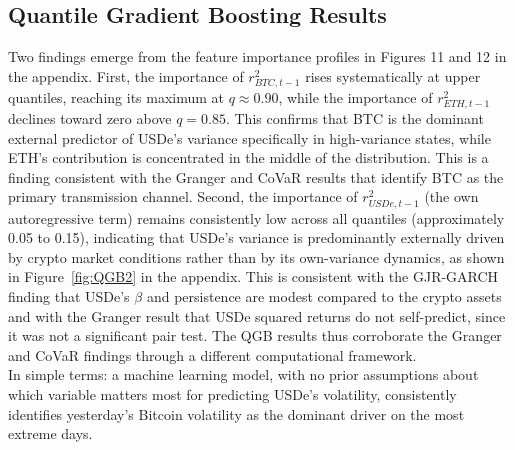 \documentclass[12pt,a4paper,titlepage,oneside,english]{article}
\begin{document}
\subsection{Quantile Gradient Boosting Results}
Two findings emerge from the feature importance profiles in Figures 11 and 12 in the appendix. First, the importance of $r^2_{BTC,t-1}$ rises systematically at upper quantiles,
reaching its maximum at $q \approx 0.90$, while the importance of $r^2_{ETH,t-1}$
declines toward zero above $q = 0.85$. This confirms that BTC is the dominant
external predictor of USDe's variance specifically in high-variance states, while
ETH's contribution is concentrated in the middle of the distribution. This is
a finding consistent with the Granger and CoVaR results that identify BTC as the
primary transmission channel. Second, the importance of $r^2_{USDe,t-1}$ (the
own autoregressive term) remains consistently low across all quantiles
(approximately 0.05 to 0.15), indicating that USDe's variance is predominantly
externally driven by crypto market conditions rather than by its own-variance dynamics, as shown in Figure~\ref{fig:QGB2} in the appendix. This is consistent with the GJR-GARCH finding that USDe's
$\beta$ and persistence are modest compared to the crypto assets and with the
Granger result that USDe squared returns do not self-predict, since it was not a significant pair test. The QGB results thus
corroborate the Granger and CoVaR findings through a different
computational framework.\\
In simple terms: a machine learning model, with no prior assumptions
about which variable matters most for predicting USDe's volatility, consistently
identifies yesterday's Bitcoin volatility as the dominant driver on the most
extreme days.
 
\end{document}
